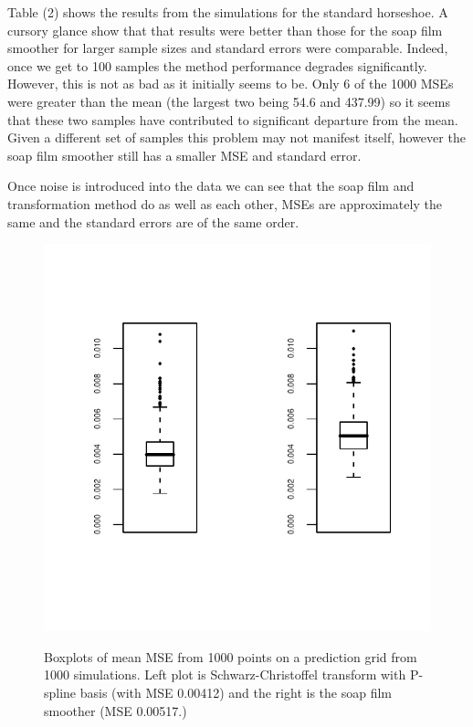 \documentclass[a4paper,10pt]{amsart}
\newcommand{\sch}{Schwarz-Christoffel }
\begin{document}
Table (2) shows the results from the simulations for the standard horseshoe. A cursory glance show that that results were better than those for the soap film smoother for larger sample sizes and standard errors were comparable. Indeed, once we get to 100 samples the method performance degrades significantly. However, this is not as bad as it initially seems to be. Only 6 of the 1000 MSEs were greater than the mean (the largest two being 54.6 and 437.99) so it seems that these two samples have contributed to significant departure from the mean. Given a different set of samples this problem may not manifest itself, however the soap film smoother still has a smaller MSE and standard error.

Once noise is introduced into the data we can see that the soap film and transformation method do as well as each other, MSEs are approximately the same and the standard errors are of the same order.

\begin{figure}
\centering
\includegraphics[trim=0.5in 1in 0in 0.5in]{figs/1000boxplots.pdf} \\
\caption{Boxplots of mean MSE from 1000 points on a prediction grid from 1000 simulations. Left plot is \sch transform with P-spline basis (with MSE 0.00412) and the right is the soap film smoother (MSE 0.00517.)}
\label{1000boxplots}
\end{figure}
\end{document}
